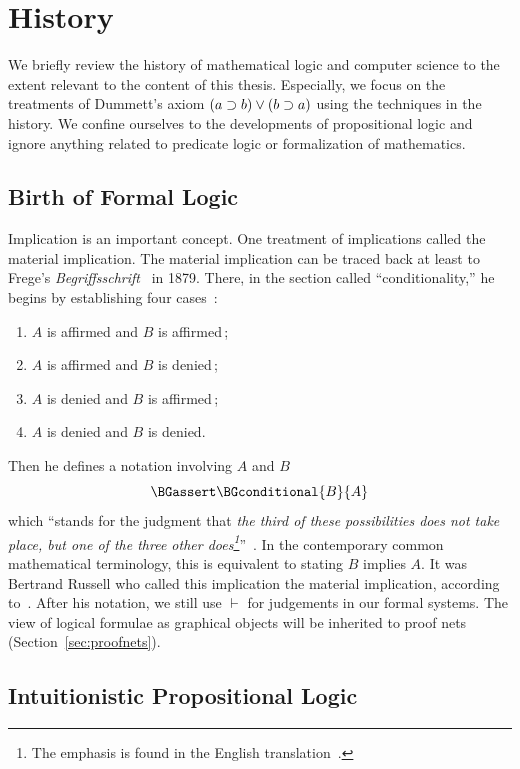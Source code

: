 \section{History}

We briefly review the history of mathematical logic and computer science
to the extent relevant to the content of this thesis.
Especially, we focus on the treatments of Dummett's axiom $(a\supset
b)\lor(b\supset a)$ using the techniques in the history.
We confine ourselves to the developments of propositional logic and
ignore anything related to predicate logic or formalization of
mathematics.

\subsection{Birth of Formal Logic}

Implication is an important concept.
One treatment of implications called the material
implication.
The material implication can be traced back at least to
Frege's \textit{Begriffsschrift}~\citep{frege} in 1879.
There, in the
section called ``conditionality,''
he begins by establishing four cases~\citep[p.~13]{frege}:
\begin{enumerate}
 \item $A$ is affirmed and $B$ is affirmed\,;
 \item $A$ is affirmed and $B$ is denied\,;
 \item $A$ is denied and $B$ is affirmed\,;
 \item $A$ is denied and $B$ is denied.
\end{enumerate}
Then he defines a notation involving $A$ and $B$
\[
\BGassert\BGconditional{B}{A}
\]
which ``stands for the
judgment that \textit{the third of these possibilities does not take
place, but one of the three other does\footnote{The emphasis is found in
the English translation~\citep[p.~14]{frege}.}}''~\citep[p.~14]{frege}.
In the contemporary common mathematical terminology, this is equivalent
to stating $B$ implies $A$.
It was Bertrand Russell who called this implication the material
implication,
according to~\citet{sep-conditionals}.
After his notation, we still use $\vdash$ for judgements in our formal
systems.
The view of logical formulae as graphical objects
will be inherited to proof nets (Section~\ref{sec:proofnets}).

\subsection{Intuitionistic Propositional Logic}

